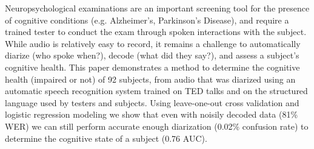 Neuropsychological examinations are an important screening tool for the presence of cognitive conditions (e.g. Alzheimer's, Parkinson's Disease), and require a trained tester to conduct the exam through spoken interactions with the subject. While audio is relatively easy to record, it remains a challenge to automatically diarize (who spoke when?), decode (what did they say?), and assess a subject's cognitive health. This paper demonstrates a method to determine the cognitive health (impaired or not) of 92 subjects, from audio that was diarized using an automatic speech recognition system trained on TED talks and on the structured language used by testers and subjects. Using leave-one-out cross validation and logistic regression modeling we show that even with noisily decoded data (81\% WER) we can still perform accurate enough diarization (0.02\% confusion rate) to determine the cognitive state of a subject (0.76 AUC).
